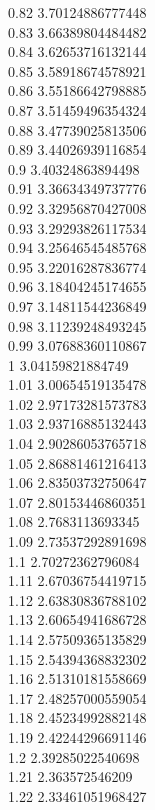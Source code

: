 {0.82	3.70124886777448\\
0.83	3.66389804484482\\
0.84	3.62653716132144\\
0.85	3.58918674578921\\
0.86	3.55186642798885\\
0.87	3.51459496354324\\
0.88	3.47739025813506\\
0.89	3.44026939116854\\
0.9	3.40324863894498\\
0.91	3.36634349737776\\
0.92	3.32956870427008\\
0.93	3.29293826117534\\
0.94	3.25646545485768\\
0.95	3.22016287836774\\
0.96	3.18404245174655\\
0.97	3.14811544236849\\
0.98	3.11239248493245\\
0.99	3.07688360110867\\
1	3.04159821884749\\
1.01	3.00654519135478\\
1.02	2.97173281573783\\
1.03	2.93716885132443\\
1.04	2.90286053765718\\
1.05	2.86881461216413\\
1.06	2.83503732750647\\
1.07	2.80153446860351\\
1.08	2.7683113693345\\
1.09	2.73537292891698\\
1.1	2.70272362796084\\
1.11	2.67036754419715\\
1.12	2.63830836788102\\
1.13	2.60654941686728\\
1.14	2.57509365135829\\
1.15	2.54394368832302\\
1.16	2.51310181558669\\
1.17	2.48257000559054\\
1.18	2.45234992882148\\
1.19	2.42244296691146\\
1.2	2.39285022540698\\
1.21	2.363572546209\\
1.22	2.33461051968427\\
}
